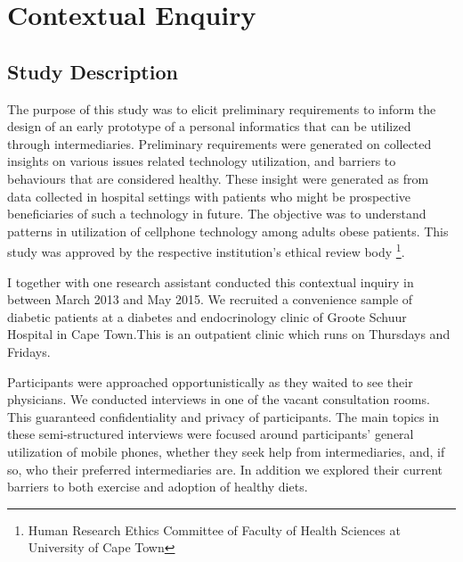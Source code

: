 
\chapter{Contextual Enquiry} %

\label{contextualenqchapter} %


\section{Study Description}
The purpose of this study was to elicit preliminary requirements to inform the design of an early prototype of a personal informatics that can be utilized through intermediaries. Preliminary requirements were generated on collected insights on various issues related technology utilization, and  barriers to behaviours that are considered healthy. These insight were generated as from data collected in hospital settings with patients who might be prospective beneficiaries of such a technology in future. The objective was to understand patterns in utilization of cellphone technology among adults obese patients. This study was approved by the respective institution's ethical review body \footnote{Human Research Ethics Committee of Faculty of Health Sciences at University of Cape Town}.

I together with one research assistant conducted this contextual inquiry in between March 2013 and May 2015. We recruited a convenience sample of diabetic patients at a diabetes and endocrinology clinic of Groote Schuur
Hospital in Cape Town.This is an outpatient clinic which runs on Thursdays and Fridays.

Participants were approached opportunistically as they waited to see their physicians. We conducted interviews in one of the vacant consultation rooms. This guaranteed confidentiality and privacy of participants. The main topics in these semi-structured interviews were focused around participants' general utilization of mobile phones, whether they seek help from intermediaries, and, if so, who their preferred intermediaries are. In addition we explored their current barriers to both exercise  and adoption of healthy diets.

